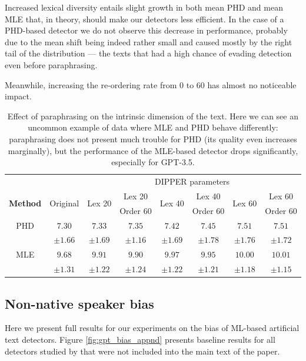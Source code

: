\documentclass{article}
\begin{document}
Increased lexical diversity entails slight growth in both mean PHD and mean MLE that, in theory, should make our detectors less efficient. In the case of a PHD-based detector we do not observe this decrease in performance, probably due to the mean shift being indeed rather small and caused mostly by the right tail of the distribution --- the texts that had a high chance of evading detection even before paraphrasing. 

Meanwhile, increasing the re-ordering rate from $0$ to $60$ has almost no noticeable impact.

\begin{table}
    \centering
    \caption{Effect of paraphrasing on the intrinsic dimension of the text. Here we can see an uncommon example of data where MLE and PHD behave differently: paraphrasing does not present much trouble for PHD (its quality even increases marginally), but the performance of the MLE-based detector drops significantly, especially for GPT-3.5.}
    \begin{tabular}{c|c|cccccc}
        \toprule
         & & \multicolumn{6}{c}{DIPPER parameters} \\
        \multirow{2}{*}{\textbf{Method}} & \multirow{2}{*}{Original} & \multirow{2}{*}{Lex 20} & Lex 20 & \multirow{2}{*}{Lex 40} & Lex 40 & \multirow{2}{*}{Lex 60} & Lex 60\\
         &  &  & Order 60 &  &  Order 60 & &  Order 60\\
         \midrule
         PHD & $7.30$ & $7.33 $ & $7.35 $ & $7.42 $ & $7.45 $ & $7.51 $ & $7.51 $ \\
          & $\pm 1.66$ & $\pm 1.69$ & $\pm 1.16$ & $\pm 1.69$ & $\pm 1.78$ & $\pm 1.76$ & $\pm 1.72$\\
         MLE & $9.68 $ & $9.91 $ & $9.90 $ & $9.97 $  & $9.95$ & $10.00$ & $10.01 $ \\
         & $\pm 1.31$ & $\pm 1.22$ & $\pm 1.24$ & $\pm 1.22$ & $ \pm 1.21$ & $\pm 1.18$ & $\pm 1.15$ \\
         \bottomrule
    \end{tabular}
    \label{tab:dipper_effect}
\end{table}

\subsection{Non-native speaker bias}
Here we present full results for our experiments on the bias of ML-based artificial text detectors. Figure \ref{fig:gpt_bias_appnd} presents baseline results for all detectors studied by \citet{liang2023gpt} that were not included into the main text of the paper.
\end{document}

